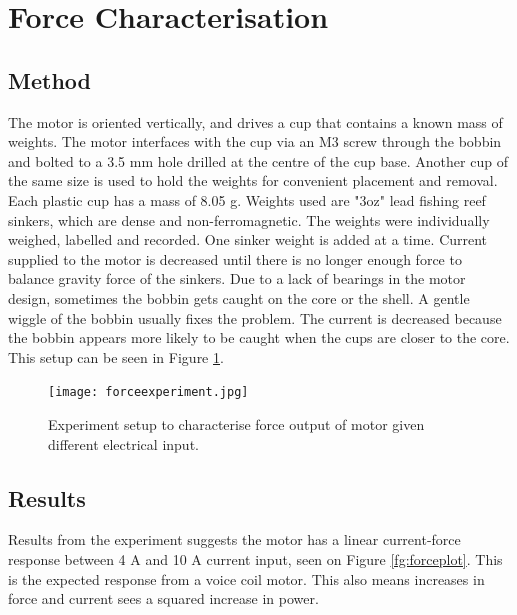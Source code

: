 \documentclass[a4paper,12pt]{article}
\begin{document}
\section{Force Characterisation} \label{section:experiment}

\subsection{Method}

The motor is oriented vertically, and drives a cup that contains a known mass of weights. The motor interfaces with the cup via an M3 screw through the bobbin and bolted to a 3.5 mm hole drilled at the centre of the cup base. Another cup of the same size is used to hold the weights for convenient placement and removal. Each plastic cup has a mass of 8.05 g. Weights used are "3oz" lead fishing reef sinkers, which are dense and non-ferromagnetic. The weights were individually weighed, labelled and recorded. One sinker weight is added at a time. Current supplied to the motor is decreased until there is no longer enough force to balance gravity force of the sinkers. Due to a lack of bearings in the motor design, sometimes the bobbin gets caught on the core or the shell. A gentle wiggle of the bobbin usually fixes the problem. The current is decreased because the bobbin appears more likely to be caught when the cups are closer to the core. This setup can be seen in Figure \ref{fg:forceexperiment}.

\begin{figure}[h!]
    \centering
    \texttt{[image: forceexperiment.jpg]}
    \caption{Experiment setup to characterise force output of motor given different electrical input.}
    \label{fg:forceexperiment}
\end{figure}

\subsection{Results}

Results from the experiment suggests the motor has a linear current-force response between 4 A and 10 A current input, seen on Figure \ref{fg:forceplot}. This is the expected response from a voice coil motor. This also means increases in force and current sees a squared increase in power.
\end{document}
